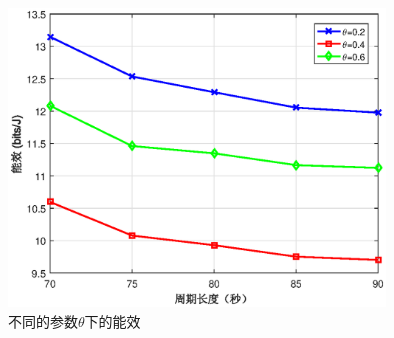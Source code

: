 \begin{figure}[H]
\centering
\includegraphics[width=10cm]{..//figures//chap4//不同的参数theta下的能效.eps}
\caption{不同的参数$\theta$下的能效}
\label{不同的参数theta下的能效}
\end{figure}

